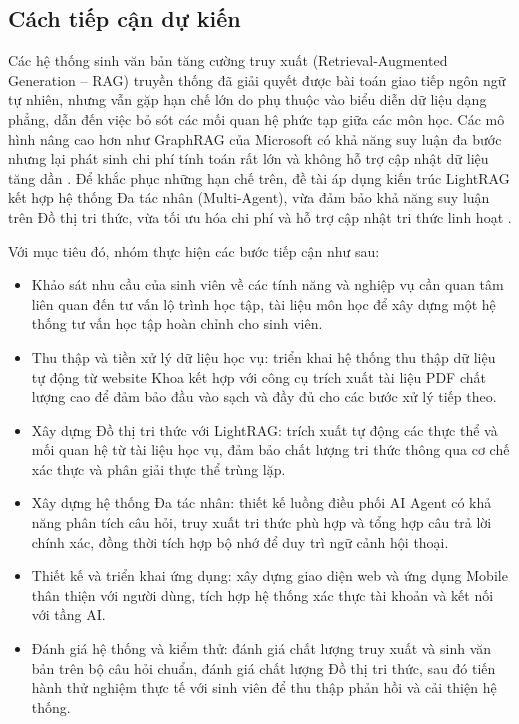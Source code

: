 \documentclass{article}[13pt]
\begin{document}
{    \subsection{Cách tiếp cận dự kiến}

    Các hệ thống sinh văn bản tăng cường truy xuất (Retrieval-Augmented Generation -- RAG) truyền thống đã giải quyết được bài toán giao tiếp ngôn ngữ tự nhiên, nhưng vẫn gặp hạn chế lớn do phụ thuộc vào biểu diễn dữ liệu dạng phẳng, dẫn đến việc bỏ sót các mối quan hệ phức tạp giữa các môn học. Các mô hình nâng cao hơn như GraphRAG của Microsoft có khả năng suy luận đa bước nhưng lại phát sinh chi phí tính toán rất lớn và không hỗ trợ cập nhật dữ liệu tăng dần \cite{graphrag2024}. Để khắc phục những hạn chế trên, đề tài áp dụng kiến trúc LightRAG kết hợp hệ thống Đa tác nhân (Multi-Agent), vừa đảm bảo khả năng suy luận trên Đồ thị tri thức, vừa tối ưu hóa chi phí và hỗ trợ cập nhật tri thức linh hoạt \cite{lightrag2024}.

    Với mục tiêu đó, nhóm thực hiện các bước tiếp cận như sau:
    \begin{itemize}[label={--}, leftmargin=1.5em]
        \item Khảo sát nhu cầu của sinh viên về các tính năng và nghiệp vụ cần quan
tâm liên quan đến tư vấn lộ trình học tập, tài liệu môn học để xây dựng
một hệ thống tư vấn học tập hoàn chỉnh cho sinh viên.
        \item Thu thập và tiền xử lý dữ liệu học vụ: triển khai hệ thống thu thập dữ liệu tự động từ website Khoa kết hợp với công cụ trích xuất tài liệu PDF chất lượng cao để đảm bảo đầu vào sạch và đầy đủ cho các bước xử lý tiếp theo.
        \item Xây dựng Đồ thị tri thức với LightRAG: trích xuất tự động các thực thể và mối quan hệ từ tài liệu học vụ, đảm bảo chất lượng tri thức thông qua cơ chế xác thực và phân giải thực thể trùng lặp.
        \item Xây dựng hệ thống Đa tác nhân: thiết kế luồng điều phối AI Agent có khả năng phân tích câu hỏi, truy xuất tri thức phù hợp và tổng hợp câu trả lời chính xác, đồng thời tích hợp bộ nhớ để duy trì ngữ cảnh hội thoại.
        \item Thiết kế và triển khai ứng dụng: xây dựng giao diện web và ứng dụng Mobile thân thiện với người dùng, tích hợp hệ thống xác thực tài khoản và kết nối với tầng AI.
        \item Đánh giá hệ thống và kiểm thử: đánh giá chất lượng truy xuất và sinh văn bản trên bộ câu hỏi chuẩn, đánh giá chất lượng Đồ thị tri thức, sau đó tiến hành thử nghiệm thực tế với sinh viên để thu thập phản hồi và cải thiện hệ thống.
    \end{itemize}

}
\end{document}
